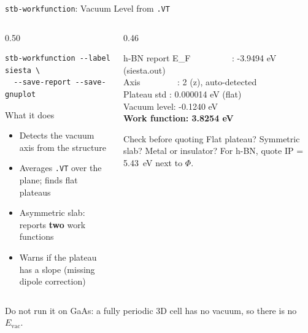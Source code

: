 \documentclass[8pt]{beamer}
\begin{document}
\begin{frame}[fragile]{\texttt{stb-workfunction}: Vacuum Level from \texttt{.VT}}
	\begin{columns}[T]
		\begin{column}{0.50\textwidth}
			{\scriptsize
\begin{verbatim}
stb-workfunction --label siesta \
  --save-report --save-gnuplot
\end{verbatim}
			}
			\begin{block}{What it does}
				\begin{itemize}
					\item Detects the vacuum axis from the structure
					\item Averages \texttt{.VT} over the plane; finds flat plateaus
					\item Asymmetric slab: reports \textbf{two} work functions
					\item Warns if the plateau has a slope (missing dipole correction)
				\end{itemize}
			\end{block}
		\end{column}
		\begin{column}{0.46\textwidth}
			\begin{block}{h-BN report}
				\ttfamily\scriptsize
				E\_F \ \ \ \ \ \ \ \ \ : -3.9494 eV (siesta.out)\\
				Axis \ \ \ \ \ \ \ \ : 2 (z), auto-detected\\
				Plateau std : 0.000014 eV (flat)\\[3pt]
				Vacuum level: -0.1240 eV\\
				\textcolor{stborange!85!black}{\textbf{Work function: 3.8254 eV}}
			\end{block}
			\vspace{0.1cm}
			\begin{alertblock}{Check before quoting}
				Flat plateau? Symmetric slab? Metal or insulator?
				For h-BN, quote IP = 5.43~eV next to $\Phi$.
			\end{alertblock}
		\end{column}
	\end{columns}
	\vspace{0.15cm}
	{\scriptsize Do not run it on GaAs: a fully periodic 3D cell has no vacuum, so there is no $E_{\text{vac}}$.}
\end{frame}
\end{document}
